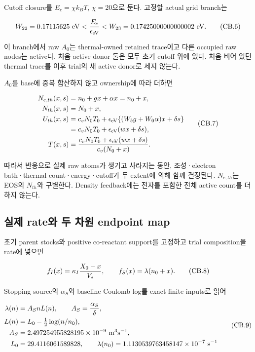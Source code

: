 \documentclass[11pt,a4paper]{article}
\begin{document}
Cutoff closure를 \(E_c=\chi k_BT\), \(\chi=20\)으로 둔다. 고정할 actual grid branch는

\[
 W_{22}=0.17115625\ {\rm eV}
 <{E_c\over\epsilon_{\rm eV}}
 <W_{23}=0.17425000000000002\ {\rm eV}.
 \tag{CB.6}
\]

이 branch에서 raw \(A_0\)는 thermal-owned retained trace이고 다른 occupied raw nodes는 active다. 처음 active donor 둘은 모두 초기 cutoff 위에 있다. 처음 비어 있던 thermal trace를 이후 trial의 새 active donor로 세지 않는다.

\(A_0\)를 base에 중복 합산하지 않고 ownership에 따라 더하면

\[
 \begin{aligned}
 N_{e,th}(x,s)&=n_0+gx+\alpha x=n_0+x,\\
 N_{th}(x,s)&=N_0+x,\\
 U_{th}(x,s)&=c_vN_0T_0+
             \epsilon_{\rm eV}\{(W_bg+W_0\alpha)x+\delta s\}\\
 &=c_vN_0T_0+\epsilon_{\rm eV}(wx+\delta s),\\
 T(x,s)&={c_vN_0T_0+\epsilon_{\rm eV}(wx+\delta s)
                    \over c_v(N_0+x)}.
 \end{aligned}\tag{CB.7}
\]

따라서 반응으로 실제 raw atoms가 생기고 사라지는 동안, 조성·electron bath·thermal count·energy·cutoff가 두 extent에 의해 함께 결정된다. \(N_{e,th}\)는 EOS의 \(N_{th}\)와 구별한다. Density feedback에는 전자를 포함한 전체 active count를 더하지 않는다.

\hypertarget{uxc2e4uxc81c-rateuxc640-uxb450-uxcc28uxc6d0-endpoint-map}{%
\subsection{실제 rate와 두 차원 endpoint map}\label{uxc2e4uxc81c-rateuxc640-uxb450-uxcc28uxc6d0-endpoint-map}}

초기 parent stocks와 positive co-reactant support를 고정하고 trial composition을 rate에 넣으면

\[
 f_I(x)=\kappa_I{X_0-x\over V_*},\qquad
 f_S(x)=\lambda(n_0+x).
 \tag{CB.8}
\]

Stopping source의 \(\alpha_S\)와 baseline Coulomb log를 exact finite inputs로 읽어

\[
 \begin{aligned}
 \lambda(n)&=A_S n L(n),\qquad A_S={\alpha_S\over\delta},\\
 L(n)&=L_0-\tfrac12\log(n/n_0),\\
 A_S&=2.497254955828195\times10^{-9}\ {\rm m^3s^{-1}},\\
 L_0&=29.4116061589828,\qquad
 \lambda(n_0)=1.1130539763458147\times10^{-7}\ {\rm s^{-1}}
 \end{aligned}\tag{CB.9}
\]
\end{document}
